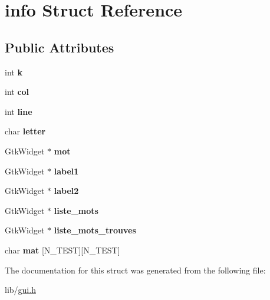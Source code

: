 \hypertarget{structinfo}{}\section{info Struct Reference}
\label{structinfo}
\subsection*{Public Attributes}
\begin{DoxyCompactItemize}
\item 
\mbox{\label{structinfo_a5b5ef990ced24216bba3dcf0b451c9a4}} 
int {\bfseries k}
\item 
\mbox{\label{structinfo_a38f67b9fe1e1ce3e60d29ad9893e371e}} 
int {\bfseries col}
\item 
\mbox{\label{structinfo_ab35661df8539d40cba1ee5be848ff377}} 
int {\bfseries line}
\item 
\mbox{\label{structinfo_a24bef6cbd3a15dcb222d2153d15731e0}} 
char {\bfseries letter}
\item 
\mbox{\label{structinfo_ae2e0eaf1c49fd0a20ed5af0af70e5d93}} 
Gtk\+Widget $\ast$ {\bfseries mot}
\item 
\mbox{\label{structinfo_a8b39211cb183cb295a7931f716857c88}} 
Gtk\+Widget $\ast$ {\bfseries label1}
\item 
\mbox{\label{structinfo_aa767a9f0c219661894209738669c38af}} 
Gtk\+Widget $\ast$ {\bfseries label2}
\item 
\mbox{\label{structinfo_ac43556531ad4d32de5c4b531554b6d94}} 
Gtk\+Widget $\ast$ {\bfseries liste\+\_\+mots}
\item 
\mbox{\label{structinfo_aa11f44b312127310a5f18c00ec39a1a1}} 
Gtk\+Widget $\ast$ {\bfseries liste\+\_\+mots\+\_\+trouves}
\item 
\mbox{\label{structinfo_a371e2bd9180042420481d7816cce2de4}} 
char {\bfseries mat} \mbox{[}N\+\_\+\+T\+E\+ST\mbox{]}\mbox{[}N\+\_\+\+T\+E\+ST\mbox{]}
\end{DoxyCompactItemize}


The documentation for this struct was generated from the following file\+:\begin{DoxyCompactItemize}
\item 
lib/\hyperlink{gui_8h}{gui.\+h}\end{DoxyCompactItemize}
